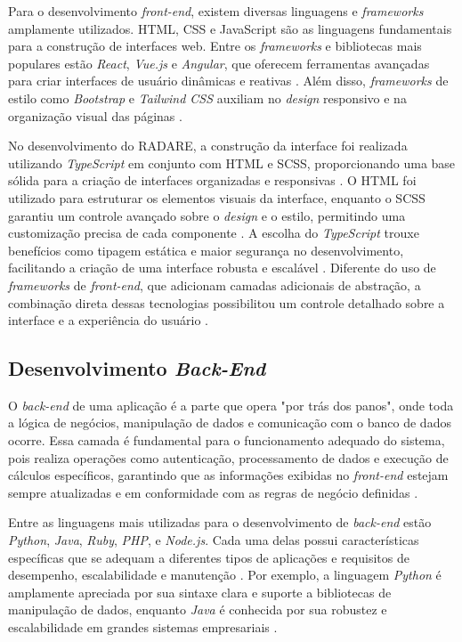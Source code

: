 Para o desenvolvimento \textit{front-end}, existem diversas linguagens e \textit{frameworks} amplamente utilizados. HTML, CSS e JavaScript são as linguagens fundamentais para a construção de interfaces web. Entre os \textit{frameworks} e bibliotecas mais populares estão \textit{React}, \textit{Vue.js} e \textit{Angular}, que oferecem ferramentas avançadas para criar interfaces de usuário dinâmicas e reativas \cite{reactbook}. Além disso, \textit{frameworks} de estilo como \textit{Bootstrap} e \textit{Tailwind CSS} auxiliam no \textit{design} responsivo e na organização visual das páginas \cite{bootstrapdoc}.

No desenvolvimento do RADARE, a construção da interface foi realizada utilizando \textit{TypeScript} em conjunto com HTML e SCSS, proporcionando uma base sólida para a criação de interfaces organizadas e responsivas \cite{typescriptbook}. O HTML foi utilizado para estruturar os elementos visuais da interface, enquanto o SCSS garantiu um controle avançado sobre o \textit{design} e o estilo, permitindo uma customização precisa de cada componente \cite{htmlcssbook}. A escolha do \textit{TypeScript} trouxe benefícios como tipagem estática e maior segurança no desenvolvimento, facilitando a criação de uma interface robusta e escalável \cite{typescriptsecurity}. Diferente do uso de \textit{frameworks} de \textit{front-end}, que adicionam camadas adicionais de abstração, a combinação direta dessas tecnologias possibilitou um controle detalhado sobre a interface e a experiência do usuário \cite{frontendwithoutframework}.

\subsection{Desenvolvimento \textit{Back-End}}

O \textit{back-end} de uma aplicação é a parte que opera "por trás dos panos", onde toda a lógica de negócios, manipulação de dados e comunicação com o banco de dados ocorre. Essa camada é fundamental para o funcionamento adequado do sistema, pois realiza operações como autenticação, processamento de dados e execução de cálculos específicos, garantindo que as informações exibidas no \textit{front-end} estejam sempre atualizadas e em conformidade com as regras de negócio definidas \cite{backendroles}.

Entre as linguagens mais utilizadas para o desenvolvimento de \textit{back-end} estão \textit{Python}, \textit{Java}, \textit{Ruby}, \textit{PHP}, e \textit{Node.js}. Cada uma delas possui características específicas que se adequam a diferentes tipos de aplicações e requisitos de desempenho, escalabilidade e manutenção \cite{backendlanguages}. Por exemplo, a linguagem \textit{Python} é amplamente apreciada por sua sintaxe clara e suporte a bibliotecas de manipulação de dados, enquanto \textit{Java} é conhecida por sua robustez e escalabilidade em grandes sistemas empresariais \cite{javabackend}.

